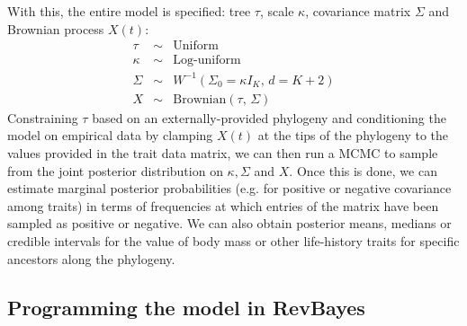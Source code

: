 \documentclass[usletter]{article}
\begin{document}
With this, the entire model is specified: tree $\tau$, scale $\kappa$, covariance matrix $\Sigma$ and Brownian process $X(t)$:
\begin{eqnarray*}
\tau &\sim& \text{Uniform}
\\
\kappa &\sim& \text{Log-uniform}
\\
\Sigma &\sim& W^{-1}(\Sigma_0 = \kappa I_K , \, d = K+2)
\\
X &\sim& \text{Brownian}(\tau, \, \Sigma)
\end{eqnarray*}
Constraining $\tau$ based on an externally-provided phylogeny and conditioning the model on empirical data by clamping $X(t)$ at the tips of the phylogeny to the values provided in the trait data matrix, we can then run a MCMC to sample from the joint posterior distribution on $\kappa, \Sigma$ and $X$. Once this is done, we can estimate marginal posterior probabilities (e.g. for positive or negative covariance among traits) in terms of frequencies at which entries of the matrix have been sampled as positive or negative. We can also obtain posterior means, medians or credible intervals for the value of body mass or other life-history traits for specific ancestors along the phylogeny.

\subsection*{Programming the model in RevBayes}
\end{document}
